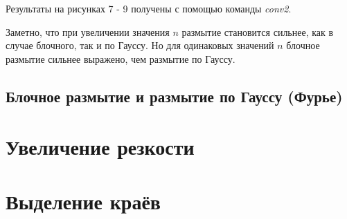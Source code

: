 \documentclass[a5paper, 10pt]{article}
\theoremstyle{definition}
\theoremstyle{plain}
\theoremstyle{remark}
\begin{document}
\newpage
Результаты на рисунках 7 - 9 получены с помощью команды \textit{conv2}. 

Заметно, что при увеличении значения $n$ размытие становится сильнее, как в случае блочного, так и по Гауссу. Но для одинаковых значений $n$ блочное размытие сильнее выражено, чем размытие по Гауссу.


\subsection{Блочное размытие и размытие по Гауссу (Фурье)}



\newpage
\section{Увеличение резкости}


\newpage
\section{Выделение краёв}
\end{document}
